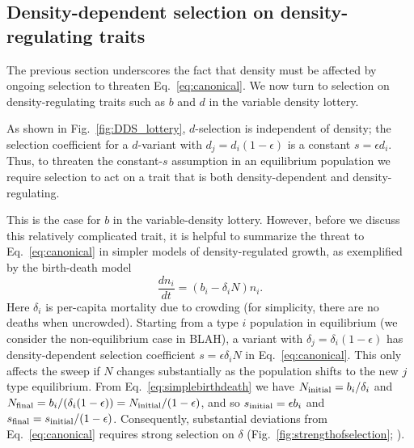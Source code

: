 \documentclass[12pt]{article}
\begin{document}
\subsection*{Density-dependent selection on density-regulating traits}

The previous section underscores the fact that density must be affected by ongoing selection to threaten Eq.~\eqref{eq:canonical}. We now turn to selection on density-regulating traits such as $b$ and $d$ in the variable density lottery. 

As shown in Fig.~\ref{fig:DDS_lottery}, $d$-selection is independent of density; the selection coefficient for a $d$-variant with $d_j= d_i(1-\epsilon)$ is a constant $s=\epsilon d_i$. Thus, to threaten the constant-$s$ assumption in an equilibrium population we require selection to act on a trait that is both density-dependent and density-regulating. 

This is the case for $b$ in the variable-density lottery. However, before we discuss this relatively complicated trait, it is helpful to summarize the threat to Eq.~\eqref{eq:canonical} in simpler models of density-regulated growth, as exemplified by the birth-death model \citep{kostitzin_1939} 
\begin{equation}
\frac{d n_i}{dt}=(b_i -\delta_iN) n_i. \label{eq:simplebirthdeath}
\end{equation}
Here $\delta_i$ is per-capita mortality due to crowding (for simplicity, there are no deaths when uncrowded). Starting from a type $i$ population in equilibrium (we consider the non-equilibrium case in BLAH), a variant with $\delta_j=\delta_i(1-\epsilon)$ has density-dependent selection coefficient $s=\epsilon \delta_i N$ in Eq.~\eqref{eq:canonical}. This only affects the sweep if $N$ changes substantially as the population shifts to the new $j$ type equilibrium. From Eq.~\eqref{eq:simplebirthdeath} we have $N_{\rm initial}=b_i/\delta_i$ and $N_{\rm final}=b_i/(\delta_i(1-\epsilon))=N_{\rm initial}/(1-\epsilon)$, and so $s_{\rm initial}= \epsilon b_i$ and $s_{\rm final}=s_{\rm initial}/(1-\epsilon)$. Consequently, substantial deviations from Eq.~\eqref{eq:canonical} requires strong selection on $\delta$ (Fig.~\ref{fig:strengthofselection}; \citealt{kimura1969natural,crow_1970}).
\end{document}
